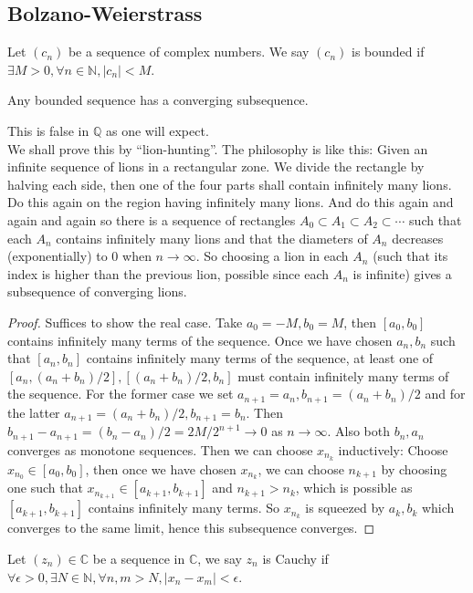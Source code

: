 \subsection{Bolzano-Weierstrass}
\begin{definition}
    Let $(c_n)$ be a sequence of complex numbers.
    We say $(c_n)$ is bounded if $\exists M>0,\forall n\in\mathbb N,|c_n|<M$.
\end{definition}
\begin{theorem}
    Any bounded sequence has a converging subsequence.
\end{theorem}
This is false in $\mathbb Q$ as one will expect.\\
We shall prove this by ``lion-hunting''.
The philosophy is like this:
Given an infinite sequence of lions in a rectangular zone.
We divide the rectangle by halving each side, then one of the four parts shall contain infinitely many lions.
Do this again on the region having infinitely many lions.
And do this again and again and again so there is a sequence of rectangles $A_0\subset A_1\subset A_2\subset\cdots$ such that each $A_n$ contains infinitely many lions and that the diameters of $A_n$ decreases (exponentially) to $0$ when $n\to\infty$.
So choosing a lion in each $A_n$ (such that its index is higher than the previous lion, possible since each $A_n$ is infinite) gives a subsequence of converging lions.
\begin{proof}
    Suffices to show the real case.
    Take $a_0=-M,b_0=M$, then $[a_0,b_0]$ contains infinitely many terms of the sequence.
    Once we have chosen $a_n,b_n$ such that $[a_n,b_n]$ contains infinitely many terms of the sequence, at least one of $[a_n,(a_n+b_n)/2],[(a_n+b_n)/2,b_n]$ must contain infinitely many terms of the sequence.
    For the former case we set $a_{n+1}=a_n,b_{n+1}=(a_n+b_n)/2$ and for the latter $a_{n+1}=(a_n+b_n)/2,b_{n+1}=b_n$.
    Then $b_{n+1}-a_{n+1}=(b_n-a_n)/2=2M/2^{n+1}\to 0$ as $n\to\infty$.
    Also both $b_n,a_n$ converges as monotone sequences.
    Then we can choose $x_{n_k}$ inductively:
    Choose $x_{n_0}\in [a_0,b_0]$, then once we have chosen $x_{n_k}$, we can choose $n_{k+1}$ by choosing one such that $x_{n_{k+1}}\in [a_{k+1},b_{k+1}]$ and $n_{k+1}>n_k$, which is possible as $[a_{k+1},b_{k+1}]$ contains infinitely many terms.
    So $x_{n_k}$ is squeezed by $a_k,b_k$ which converges to the same limit, hence this subsequence converges.
\end{proof}
\begin{definition}
    Let $(z_n)\in\mathbb C$ be a sequence in $\mathbb C$, we say $z_n$ is Cauchy if $\forall\epsilon>0,\exists N\in\mathbb N,\forall n,m>N,|x_n-x_m|<\epsilon$.
\end{definition}
